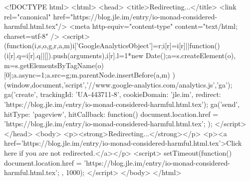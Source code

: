 <!DOCTYPE html>
<html>
<head>
<title>Redirecting...</title>
<link rel="canonical" href="https://blog.jle.im/entry/io-monad-considered-harmful.html.tex"/>
<meta http-equiv="content-type" content="text/html; charset=utf-8" />
<script>
(function(i,s,o,g,r,a,m){i['GoogleAnalyticsObject']=r;i[r]=i[r]||function(){
(i[r].q=i[r].q||[]).push(arguments)},i[r].l=1*new Date();a=s.createElement(o),
m=s.getElementsByTagName(o)[0];a.async=1;a.src=g;m.parentNode.insertBefore(a,m)
})(window,document,'script','//www.google-analytics.com/analytics.js','ga');
ga('create', { trackingId: 'UA-443711-8', cookieDomain: 'jle.im', redirect: 'https://blog.jle.im/entry/io-monad-considered-harmful.html.tex'});
ga('send', { hitType: 'pageview', hitCallback: function() { document.location.href = 'https://blog.jle.im/entry/io-monad-considered-harmful.html.tex'; } });
</script>
</head>
<body>
  <p><strong>Redirecting...</strong></p>
  <p><a href='https://blog.jle.im/entry/io-monad-considered-harmful.html.tex'>Click here if you are not redirected.</a></p>
  <script>
    setTimeout(function() { document.location.href = 'https://blog.jle.im/entry/io-monad-considered-harmful.html.tex'; }, 1000);
  </script>
</body>
</html>
